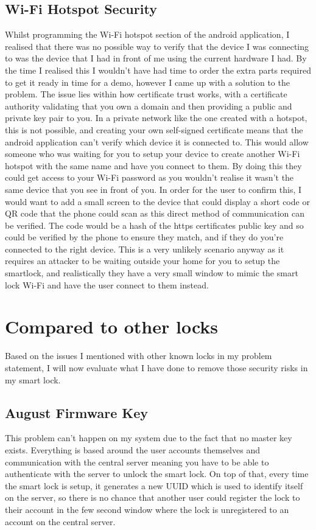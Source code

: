 \subsection{Wi-Fi Hotspot Security}
Whilst programming the Wi-Fi hotspot section of the android application, I realised that there was no possible way to verify that the device I was connecting to was the device that I had in front of me using the current hardware I had. By the time I realised this I wouldn't have had time to order the extra parts required to get it ready in time for a demo, however I came up with a solution to the problem. The issue lies within how certificate trust works, with a certificate authority validating that you own a domain and then providing a public and private key pair to you. In a private network like the one created with a hotspot, this is not possible, and creating your own self-signed certificate means that the android application can't verify which device it is connected to. This would allow someone who was waiting for you to setup your device to create another Wi-Fi hotspot with the same name and have you connect to them. By doing this they could get access to your Wi-Fi password as you wouldn't realise it wasn't the same device that you see in front of you. In order for the user to confirm this, I would want to add a small screen to the device that could display a short code or QR code that the phone could scan as this direct method of communication can be verified. The code would be a hash of the https certificates public key and so could be verified by the phone to ensure they match, and if they do you're connected to the right device. This is a very unlikely scenario anyway as it requires an attacker to be waiting outside your home for you to setup the smartlock, and realistically they have a very small window to mimic the smart lock Wi-Fi and have the user connect to them instead.

\section{Compared to other locks}
Based on the issues I mentioned with other known locks in my problem statement, I will now evaluate what I have done to remove those security risks in my smart lock.

\subsection{August Firmware Key}
This problem can't happen on my system due to the fact that no master key exists. Everything is based around the user accounts themselves and communication with the central server meaning you have to be able to authenticate with the server to unlock the smart lock. On top of that, every time the smart lock is setup, it generates a new UUID which is used to identify itself on the server, so there is no chance that another user could register the lock to their account in the few second window where the lock is unregistered to an account on the central server.

